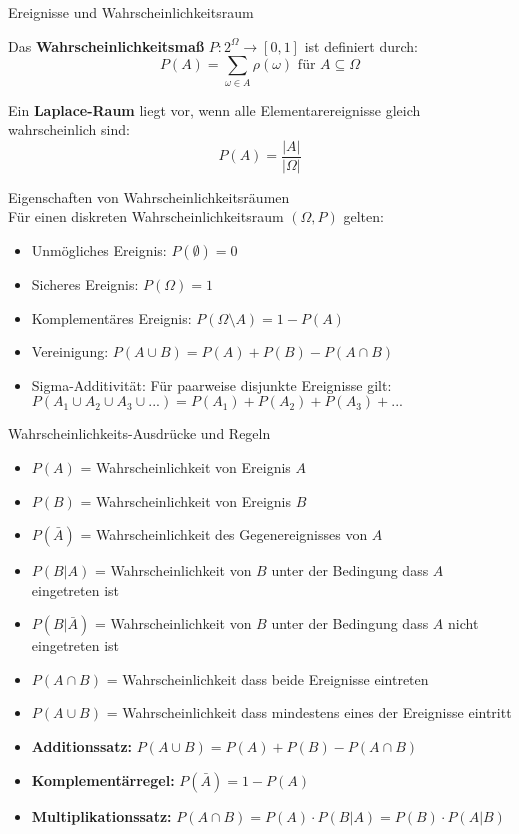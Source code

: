 \begin{concept}{Ereignisse und Wahrscheinlichkeitsraum}

Das \textbf{Wahrscheinlichkeitsmaß} $P: 2^\Omega \rightarrow [0,1]$ ist definiert durch:
$$P(A) = \sum_{\omega \in A} \rho(\omega) \text{ für } A \subseteq \Omega$$

Ein \textbf{Laplace-Raum} liegt vor, wenn alle Elementarereignisse gleich wahrscheinlich sind:
$$P(A)=\frac{|A|}{|\Omega|}$$
\end{concept}

\begin{theorem}{Eigenschaften von Wahrscheinlichkeitsräumen}\\
Für einen diskreten Wahrscheinlichkeitsraum $(\Omega,P)$ gelten:
\begin{itemize}
    \item Unmögliches Ereignis: $P(\emptyset) = 0$
    \item Sicheres Ereignis: $P(\Omega) = 1$
    \item Komplementäres Ereignis: $P(\Omega \setminus A) = 1 - P(A)$
    \item Vereinigung: $P(A \cup B) = P(A) + P(B) - P(A \cap B)$
    \item Sigma-Additivität: Für paarweise disjunkte Ereignisse gilt:\\
    $P(A_1 \cup A_2 \cup A_3 \cup ...) = P(A_1) + P(A_2) + P(A_3) + ...$
\end{itemize}
\end{theorem}

\begin{corollary}{Wahrscheinlichkeits-Ausdrücke und Regeln}
\begin{itemize}
    \item $P(A)$ = Wahrscheinlichkeit von Ereignis $A$
    \item $P(B)$ = Wahrscheinlichkeit von Ereignis $B$
    \item $P(\bar{A})$ = Wahrscheinlichkeit des Gegenereignisses von $A$
    \item $P(B|A)$ = Wahrscheinlichkeit von $B$ unter der Bedingung dass $A$ eingetreten ist
    \item $P(B|\bar{A})$ = Wahrscheinlichkeit von $B$ unter der Bedingung dass $A$ nicht eingetreten ist
    \item $P(A \cap B)$ = Wahrscheinlichkeit dass beide Ereignisse eintreten
    \item $P(A \cup B)$ = Wahrscheinlichkeit dass mindestens eines der Ereignisse eintritt
    \item \textbf{Additionssatz:} $P(A \cup B) = P(A) + P(B) - P(A \cap B)$
    \item \textbf{Komplementärregel:} $P(\bar{A}) = 1 - P(A)$
    \item \textbf{Multiplikationssatz:} $P(A \cap B) = P(A) \cdot P(B|A) = P(B) \cdot P(A|B)$
\end{itemize}   
\end{corollary}

